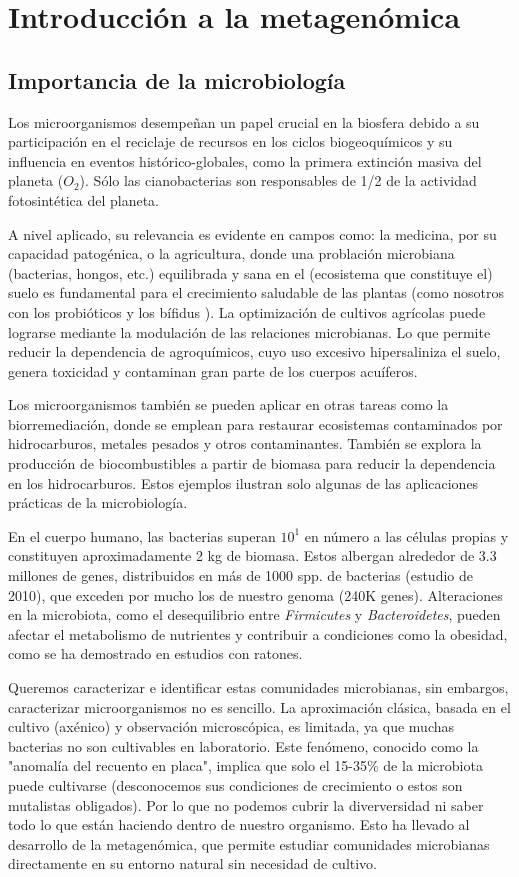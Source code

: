 \chapter{Introducción a la metagenómica}
\section{Importancia de la microbiología}
Los microorganismos desempeñan un papel crucial en la biosfera debido a su participación en el reciclaje de recursos en los ciclos biogeoquímicos y su influencia en eventos histórico-globales, como la primera extinción masiva del planeta ($O_2$). Sólo las cianobacterias son responsables de 1/2 de la actividad fotosintética del planeta. %

A nivel aplicado, su relevancia es evidente en campos como: la medicina, por su capacidad patogénica, o la agricultura, donde una problación microbiana (bacterias, hongos, etc.) equilibrada y sana en el (ecosistema que constituye el) suelo es fundamental para el crecimiento saludable de las plantas (como nosotros con los probióticos y los bífidus %
). La optimización de cultivos agrícolas puede lograrse mediante la modulación de las relaciones microbianas. Lo que permite reducir la dependencia de agroquímicos, cuyo uso excesivo hipersaliniza el suelo, genera toxicidad y contaminan gran parte de los cuerpos acuíferos. 

Los microorganismos también se pueden aplicar en otras tareas como la biorremediación, donde se emplean para restaurar ecosistemas contaminados por hidrocarburos, metales pesados y otros contaminantes. También se explora la producción de biocombustibles a partir de biomasa para reducir la dependencia en los hidrocarburos. Estos ejemplos ilustran solo algunas de las aplicaciones prácticas de la microbiología.

En el cuerpo humano, las bacterias superan $10^1$ en número a las células propias y constituyen aproximadamente 2 kg de biomasa. Estos albergan alrededor de 3.3 millones de genes, distribuidos en más de 1000 spp. de bacterias (estudio de 2010), que exceden por mucho los de nuestro genoma (240K genes). Alteraciones en la microbiota, como el desequilibrio entre \textit{Firmicutes} y \textit{Bacteroidetes}, pueden afectar el metabolismo de nutrientes y contribuir a condiciones como la obesidad, como se ha demostrado en estudios con ratones. %

Queremos caracterizar e identificar estas comunidades microbianas, sin embargos, caracterizar microorganismos no es sencillo. La aproximación clásica, basada en el cultivo (axénico) y observación microscópica, es limitada, ya que muchas bacterias no son cultivables en laboratorio. Este fenómeno, conocido como la "anomalía del recuento en placa", implica que solo el 15-35\% de la microbiota puede cultivarse (desconocemos sus condiciones de crecimiento o estos son mutalistas obligados). Por lo que no podemos cubrir la diverversidad ni saber todo lo que están haciendo dentro de nuestro organismo. Esto ha llevado al desarrollo de la metagenómica, que permite estudiar comunidades microbianas directamente en su entorno natural sin necesidad de cultivo.

